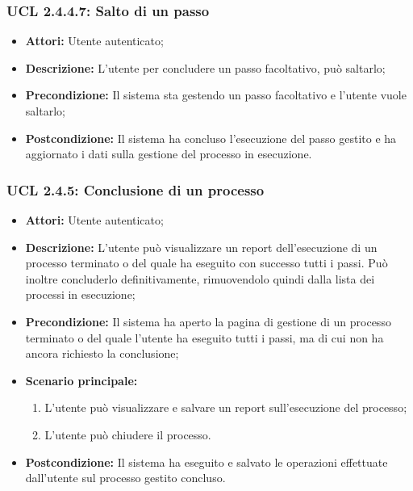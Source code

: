 \hypertarget{L2.4.4.7}{}
\subsubsection{UCL 2.4.4.7: Salto di un passo}
\begin{itemize}
\item \textbf{Attori:} Utente autenticato;
\item \textbf{Descrizione:} L'utente per concludere un passo facoltativo, può saltarlo;
\item \textbf{Precondizione:} Il sistema sta gestendo un passo facoltativo e l'utente vuole saltarlo;
\item \textbf{Postcondizione:} Il sistema ha concluso l'esecuzione del passo gestito e ha aggiornato i dati sulla gestione del processo in esecuzione.
\end{itemize}

\hypertarget{L2.4.5}{}
\subsubsection{UCL 2.4.5: Conclusione di un processo}
\begin{itemize}
\item \textbf{Attori:} Utente autenticato;
\item \textbf{Descrizione:} L'utente può visualizzare un report dell'esecuzione di un processo terminato o del quale ha eseguito con successo tutti i passi. Può inoltre concluderlo definitivamente, rimuovendolo quindi dalla lista dei processi in esecuzione;
\item \textbf{Precondizione:} Il sistema ha aperto la pagina di gestione di un processo terminato o del quale l'utente ha eseguito tutti i passi, ma di cui non ha ancora richiesto la conclusione;
\item \textbf{Scenario principale:}
\begin{enumerate}
\item L'utente può visualizzare e salvare un report sull'esecuzione del processo;
\item L'utente può chiudere il processo.
\end{enumerate}
\item \textbf{Postcondizione:} Il sistema ha eseguito e salvato le operazioni effettuate dall'utente sul processo gestito concluso.
\end{itemize}

